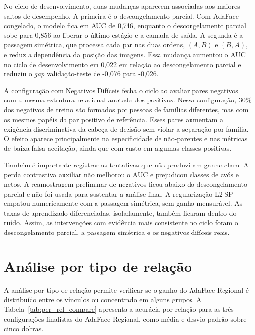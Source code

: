 No ciclo de desenvolvimento, duas mudanças aparecem associadas aos maiores saltos de desempenho. A primeira é o descongelamento parcial. Com AdaFace congelado, o modelo fica em AUC de 0,746, enquanto o descongelamento parcial sobe para 0,856 ao liberar o último estágio e a camada de saída. A segunda é a passagem simétrica, que processa cada par nas duas ordens, $(A,B)$ e $(B,A)$, e reduz a dependência da posição das imagens. Essa mudança aumentou o AUC no ciclo de desenvolvimento em 0,022 em relação ao descongelamento parcial e reduziu o \textit{gap} validação-teste de -0,076 para -0,026.

A configuração com Negativos Difíceis fecha o ciclo ao avaliar pares negativos com a mesma estrutura relacional anotada dos positivos. Nessa configuração, 30\% dos negativos de treino são formados por pessoas de famílias diferentes, mas com os mesmos papéis do par positivo de referência. Esses pares aumentam a exigência discriminativa da cabeça de decisão sem violar a separação por família. O efeito aparece principalmente na especificidade de não-parentes e nas métricas de baixa falsa aceitação, ainda que com custo em algumas classes positivas.

Também é importante registrar as tentativas que não produziram ganho claro. A perda contrastiva auxiliar não melhorou o AUC e prejudicou classes de avós e netos. A reamostragem preliminar de negativos ficou abaixo do descongelamento parcial e não foi usada para sustentar a análise final. A regularização L2-SP empatou numericamente com a passagem simétrica, sem ganho mensurável. As taxas de aprendizado diferenciadas, isoladamente, também ficaram dentro do ruído. Assim, as intervenções com evidência mais consistente no ciclo foram o descongelamento parcial, a passagem simétrica e os negativos difíceis reais.

\section{Análise por tipo de relação}

A análise por tipo de relação permite verificar se o ganho do AdaFace-Regional é distribuído entre os vínculos ou concentrado em alguns grupos. A Tabela~\ref{tab:per_rel_compare} apresenta a acurácia por relação para as três configurações finalistas do AdaFace-Regional, como média e desvio padrão sobre cinco dobras.


